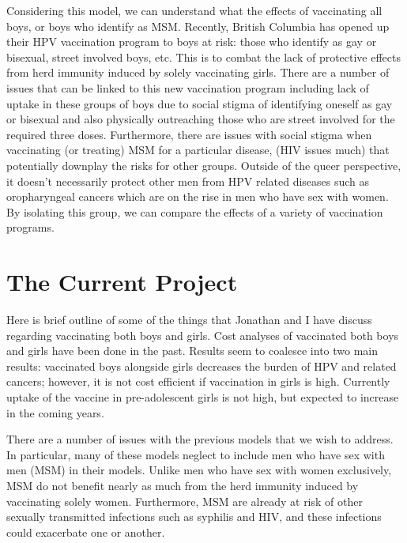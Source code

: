 \documentclass[12pt]{article}
\begin{document}
Considering this model, we can understand what the effects of vaccinating all boys, or boys who identify as MSM.  Recently, British Columbia has opened up their HPV vaccination program to boys at risk: those who identify as gay or bisexual, street involved boys, etc. This is to combat the lack of protective effects from herd immunity induced by solely vaccinating girls.  There are a number of issues that can be linked to this new vaccination program including lack of uptake in these groups of boys due to social stigma of identifying oneself as gay or bisexual and also physically outreaching those who are street involved for the required three doses. Furthermore, there are issues with social stigma when vaccinating (or treating) MSM for a particular disease, (HIV issues much) that potentially downplay the risks for other groups.  Outside of the queer perspective, it doesn't necessarily protect other men from HPV related diseases such as oropharyngeal cancers which are on the rise in men who have sex with women.  By isolating this group, we can compare the effects of a variety of vaccination programs. 


\section{The Current Project}

Here is brief outline of some of the things that Jonathan and I have discuss regarding vaccinating both boys and girls.  Cost analyses of vaccinated both boys and girls have been done in the past.  Results seem to coalesce into two main results: vaccinated boys alongside girls decreases the burden of HPV and related cancers; however, it is not cost efficient if vaccination in girls is high.  Currently uptake of the vaccine in pre-adolescent girls is not high, but expected to increase in the coming years. 

There are a number of issues with the previous models that we wish to address.  In particular, many of these models neglect to include men who have sex with men (MSM) in their models.  Unlike men who have sex with women exclusively, MSM do not benefit nearly as much from the herd immunity induced by vaccinating solely women.  Furthermore, MSM are already at risk of other sexually transmitted infections such as syphilis and HIV, and these infections could exacerbate one or another.  
\end{document}
